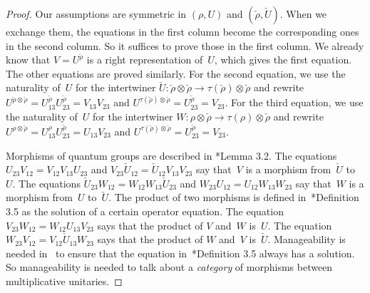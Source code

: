 \documentclass[a4paper]{amsart}
\numberwithin{equation}{section}
\theoremstyle{plain}
\numberwithin{theorem}{section}
\theoremstyle{definition}
\theoremstyle{remark}
\newcommand*{\Trivial}{\tau}%
\begin{document}
\begin{proof}
  Our assumptions are symmetric in \((\rho,U)\)
  and \((\check{\rho},\check{U})\).
  When we exchange them, the equations in the first column become the
  corresponding ones in the second column.  So it suffices to prove
  those in the first column.  We already know that
  \(V=U^{\check\rho}\)
  is a right representation of~\(U\),
  which gives the first equation.  The other equations are proved
  similarly.  For the second equation, we use the naturality of~\(U\)
  for the intertwiner
  \(\check{U}\colon \check\rho\otimes \check\rho \to
  \Trivial(\check\rho) \otimes \check\rho\)
  and rewrite
  \(U^{\check\rho\otimes \check\rho} = U^{\check\rho}_{13}
  U^{\check\rho}_{23} = V_{13} V_{23}\)
  and
  \(U^{\Trivial(\check\rho)\otimes \check\rho} = U^{\check\rho}_{23} =
  V_{23}\).
  For the third equation, we use the naturality of~\(U\)
  for the intertwiner
  \(W\colon \rho\otimes \check\rho \to \Trivial(\rho) \otimes
  \check\rho\)
  and rewrite
  \(U^{\rho\otimes \check\rho} = U^{\rho}_{13} U^{\check\rho}_{23} =
  U_{13} V_{23}\)
  and
  \(U^{\Trivial(\check\rho)\otimes \check\rho} = U^{\check\rho}_{23} =
  V_{23}\).

  Morphisms of quantum groups are described in
  \cite{Meyer-Roy-Woronowicz:Homomorphisms}*{Lemma 3.2}.  The
  equations \(U_{23} V_{12} = V_{12} V_{13} U_{23}\)
  and \(V_{23} \check{U}_{12} = \check{U}_{12} V_{13} V_{23}\)
  say that~\(V\)
  is a morphism from~\(\check{U}\)
  to~\(U\).
  The equations
  \(\check{U}_{23} W_{12} = W_{12} W_{13} \check{U}_{23}\)
  and \(W_{23} U_{12} = U_{12} W_{13} W_{23}\)
  say that~\(W\)
  is a morphism from~\(U\)
  to~\(\check{U}\).
  The product of two morphisms is defined
  in~\cite{Meyer-Roy-Woronowicz:Homomorphisms}*{Definition 3.5} as the
  solution of a certain operator equation.  The equation
  \(V_{23} W_{12} = W_{12} U_{13} V_{23}\)
  says that the product of \(V\)
  and~\(W\)
  is~\(U\).
  The equation \(W_{23} V_{12} = V_{12} \check{U}_{13} W_{23}\)
  says that the product of \(W\)
  and~\(V\)
  is~\(\check{U}\).
  Manageability is needed in~\cite{Meyer-Roy-Woronowicz:Homomorphisms}
  to ensure that the equation
  in~\cite{Meyer-Roy-Woronowicz:Homomorphisms}*{Definition 3.5} always
  has a solution.  So manageability is needed to talk about a
  \emph{category} of morphisms between multiplicative unitaries.
\end{proof}
\end{document}
